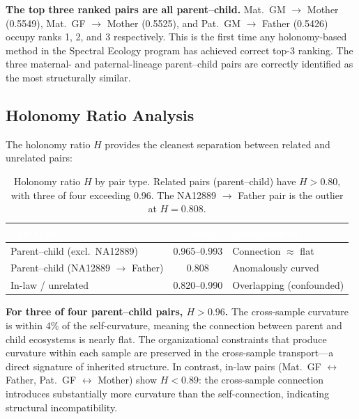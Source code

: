 \documentclass{../yalumba}
\begin{document}

\begin{keyfinding}
\textbf{The top three ranked pairs are all parent--child.}  Mat.~GM $\to$
Mother (0.5549), Mat.~GF $\to$ Mother (0.5525), and Pat.~GM $\to$ Father
(0.5426) occupy ranks 1, 2, and 3 respectively.  This is the first time
any holonomy-based method in the Spectral Ecology program has achieved
correct top-3 ranking.  The three maternal- and paternal-lineage parent--child
pairs are correctly identified as the most structurally similar.
\end{keyfinding}

\subsection{Holonomy Ratio Analysis}

The holonomy ratio $H$ provides the cleanest separation between related and
unrelated pairs:

\begin{table}[H]
  \centering
  \tablestyle
  \caption{Holonomy ratio $H$ by pair type.  Related pairs (parent--child)
    have $H > 0.80$, with three of four exceeding 0.96.  The NA12889
    $\to$ Father pair is the outlier at $H = 0.808$.}
  \label{tab:holonomy}
  \begin{tabular}{lcl}
    \toprule
    \rowcolor{table-header}
    \textcolor{white}{\textbf{Pair type}} &
    \textcolor{white}{\textbf{$H$ range}} &
    \textcolor{white}{\textbf{Interpretation}} \\
    \midrule
    Parent--child (excl.~NA12889)
      & 0.965--0.993 & Connection $\approx$ flat \\
    Parent--child (NA12889 $\to$ Father)
      & 0.808 & Anomalously curved \\
    In-law / unrelated
      & 0.820--0.990 & Overlapping (confounded) \\
    \bottomrule
  \end{tabular}
\end{table}

\begin{keyfinding}
\textbf{For three of four parent--child pairs, $H > 0.96$.}  The cross-sample
curvature is within 4\% of the self-curvature, meaning the connection between
parent and child ecosystems is nearly flat.  The organizational constraints
that produce curvature within each sample are preserved in the cross-sample
transport---a direct signature of inherited structure.  In contrast,
in-law pairs (Mat.~GF $\leftrightarrow$ Father, Pat.~GF $\leftrightarrow$
Mother) show $H < 0.89$: the cross-sample connection introduces
substantially more curvature than the self-connection, indicating
structural incompatibility.
\end{keyfinding}
\end{document}
